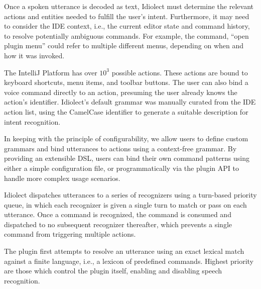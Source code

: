 \documentclass[conference]{IEEEtran}
\begin{document}
Once a spoken utterance is decoded as text, Idiolect must determine the relevant actions and entities needed to fulfill the user's intent. Furthermore, it may need to consider the IDE context, i.e., the current editor state and command history, to resolve potentially ambiguous commands. For example, the command, ``open plugin menu'' could refer to multiple different menus, depending on when and how it was invoked.

The IntelliJ Platform has over $10^3$ possible actions. These actions are bound to keyboard shortcuts, menu items, and toolbar buttons. The user can also bind a voice command directly to an action, presuming the user already knows the action's identifier. Idiolect's default grammar was manually curated from the IDE action list, using the CamelCase identifier to generate a suitable description for intent recognition.

In keeping with the principle of configurability, we allow users to define custom grammars and bind utterances to actions using a context-free grammar. By providing an extensible DSL, users can bind their own command patterns using either a simple configuration file, or programmatically via the plugin API to handle more complex usage scenarios.



Idiolect dispatches utterances to a series of recognizers using a turn-based priority queue, in which each recognizer is given a single turn to match or pass on each utterance. Once a command is recognized, the command is consumed and dispatched to no subsequent recognizer thereafter, which prevents a single command from triggering multiple actions.

The plugin first attempts to resolve an utterance using an exact lexical match against a finite language, i.e., a lexicon of predefined commands. Highest priority are those which control the plugin itself, enabling and disabling speech recognition.
\end{document}
